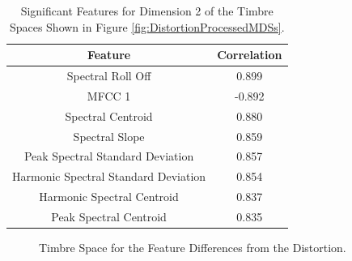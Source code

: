 		\begin{table}[h!]
			\centering
			\begin{tabular}{|c|c|}
				\hline
				\bf{Feature} & \bf{Correlation} \\
				\hline
				\hline
				Spectral Roll Off &  0.899 \\
				\hline
				MFCC 1 & -0.892 \\
				\hline
				Spectral Centroid &  0.880 \\
				\hline
				Spectral Slope &  0.859 \\
				\hline
				Peak Spectral Standard Deviation &  0.857 \\
				\hline
				Harmonic Spectral Standard Deviation &  0.854 \\
				\hline
				Harmonic Spectral Centroid &  0.837 \\
				\hline
				Peak Spectral Centroid &  0.835 \\
				\hline
			\end{tabular}
			\caption{Significant Features for Dimension 2 of the Timbre Spaces Shown in Figure 
				 \ref{fig:DistortionProcessedMDSs}.}
			\label{tab:DistortionProcessedFeaturesDim2}
		\end{table}

		\begin{figure}[h!]
			\centering
			\qquad
			\caption{Timbre Space for the Feature Differences from the Distortion.}
			\label{fig:DistortionDifferenceMDSs}
		\end{figure}

